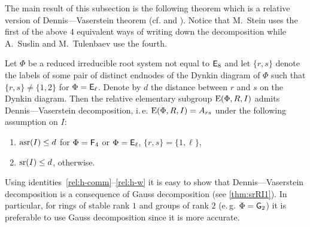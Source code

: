 The main result of this subsection is the following theorem which is a relative version of Dennis---Vaserstein theorem (cf. \cite[Lemma~2.1]{ST76} and \cite[Theorem~2.5]{St78}).
Notice that M.~Stein uses the first of the above $4$ equivalent ways of writing down the decomposition while A.~Suslin and M.~Tulenbaev use the fourth.
\begin{thm}\label{thm:DennisVaserstein}
Let $\Phi$ be a reduced irreducible root system not equal to $\mathsf{E}_8$ and let $\{ r, s \}$ denote the labels of some pair of distinct endnodes of the Dynkin diagram of $\Phi$
such that $\{ r, s\} \neq \{ 1,2 \}$ for $\Phi=\mathsf{E}_\ell$. Denote by $d$ the distance between $r$ and $s$ on the Dynkin diagram.
Then the relative elementary subgroup $\operatorname{E}(\Phi, R, I)$ admits Dennis---Vaserstein decomposition, i.\,e. $\operatorname{E}(\Phi, R, I) = A_{rs}$ 
under the following assumption on $I$:
\begin{enumerate}
 \item $\operatorname{asr}(I) \leq d$ for $\Phi=\mathsf{F}_4$ or $\Phi=\mathsf{E}_\ell$, $\{r, s\} = \{1, \ell \}$,
 \item $\operatorname{sr}(I) \leq d$, otherwise.
\end{enumerate}

\end{thm}
Using identities~\ref{rel:h-comm}--\ref{rel:h-w} it is easy to show that Dennis---Vaserstein decomposition is a consequence of Gauss decomposition (see \cref{thm:srRI1}).
In particular, for rings of stable rank $1$ and groups of rank $2$ (e.\,g. $\Phi=\mathsf{G}_2$) it is preferable to use Gauss decomposition since it is more accurate.

